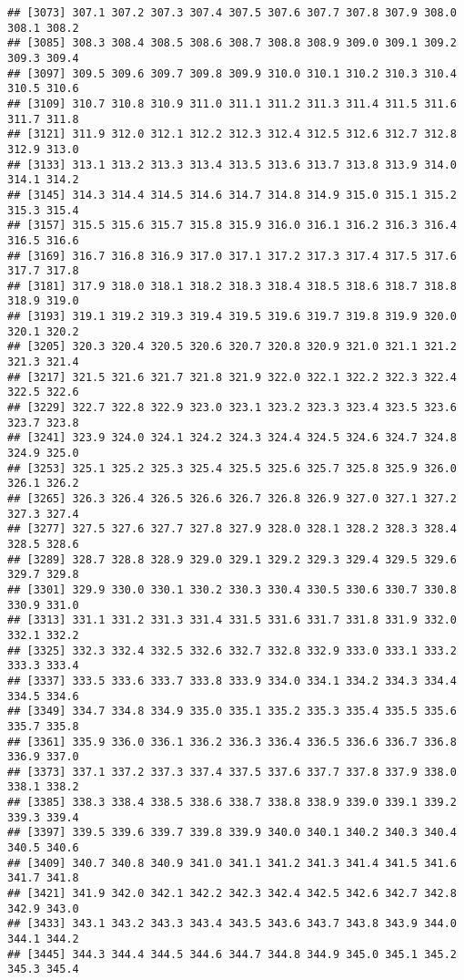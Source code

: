 \documentclass[
]{article}
\begin{document}
\begin{verbatim}
## [3073] 307.1 307.2 307.3 307.4 307.5 307.6 307.7 307.8 307.9 308.0 308.1 308.2
## [3085] 308.3 308.4 308.5 308.6 308.7 308.8 308.9 309.0 309.1 309.2 309.3 309.4
## [3097] 309.5 309.6 309.7 309.8 309.9 310.0 310.1 310.2 310.3 310.4 310.5 310.6
## [3109] 310.7 310.8 310.9 311.0 311.1 311.2 311.3 311.4 311.5 311.6 311.7 311.8
## [3121] 311.9 312.0 312.1 312.2 312.3 312.4 312.5 312.6 312.7 312.8 312.9 313.0
## [3133] 313.1 313.2 313.3 313.4 313.5 313.6 313.7 313.8 313.9 314.0 314.1 314.2
## [3145] 314.3 314.4 314.5 314.6 314.7 314.8 314.9 315.0 315.1 315.2 315.3 315.4
## [3157] 315.5 315.6 315.7 315.8 315.9 316.0 316.1 316.2 316.3 316.4 316.5 316.6
## [3169] 316.7 316.8 316.9 317.0 317.1 317.2 317.3 317.4 317.5 317.6 317.7 317.8
## [3181] 317.9 318.0 318.1 318.2 318.3 318.4 318.5 318.6 318.7 318.8 318.9 319.0
## [3193] 319.1 319.2 319.3 319.4 319.5 319.6 319.7 319.8 319.9 320.0 320.1 320.2
## [3205] 320.3 320.4 320.5 320.6 320.7 320.8 320.9 321.0 321.1 321.2 321.3 321.4
## [3217] 321.5 321.6 321.7 321.8 321.9 322.0 322.1 322.2 322.3 322.4 322.5 322.6
## [3229] 322.7 322.8 322.9 323.0 323.1 323.2 323.3 323.4 323.5 323.6 323.7 323.8
## [3241] 323.9 324.0 324.1 324.2 324.3 324.4 324.5 324.6 324.7 324.8 324.9 325.0
## [3253] 325.1 325.2 325.3 325.4 325.5 325.6 325.7 325.8 325.9 326.0 326.1 326.2
## [3265] 326.3 326.4 326.5 326.6 326.7 326.8 326.9 327.0 327.1 327.2 327.3 327.4
## [3277] 327.5 327.6 327.7 327.8 327.9 328.0 328.1 328.2 328.3 328.4 328.5 328.6
## [3289] 328.7 328.8 328.9 329.0 329.1 329.2 329.3 329.4 329.5 329.6 329.7 329.8
## [3301] 329.9 330.0 330.1 330.2 330.3 330.4 330.5 330.6 330.7 330.8 330.9 331.0
## [3313] 331.1 331.2 331.3 331.4 331.5 331.6 331.7 331.8 331.9 332.0 332.1 332.2
## [3325] 332.3 332.4 332.5 332.6 332.7 332.8 332.9 333.0 333.1 333.2 333.3 333.4
## [3337] 333.5 333.6 333.7 333.8 333.9 334.0 334.1 334.2 334.3 334.4 334.5 334.6
## [3349] 334.7 334.8 334.9 335.0 335.1 335.2 335.3 335.4 335.5 335.6 335.7 335.8
## [3361] 335.9 336.0 336.1 336.2 336.3 336.4 336.5 336.6 336.7 336.8 336.9 337.0
## [3373] 337.1 337.2 337.3 337.4 337.5 337.6 337.7 337.8 337.9 338.0 338.1 338.2
## [3385] 338.3 338.4 338.5 338.6 338.7 338.8 338.9 339.0 339.1 339.2 339.3 339.4
## [3397] 339.5 339.6 339.7 339.8 339.9 340.0 340.1 340.2 340.3 340.4 340.5 340.6
## [3409] 340.7 340.8 340.9 341.0 341.1 341.2 341.3 341.4 341.5 341.6 341.7 341.8
## [3421] 341.9 342.0 342.1 342.2 342.3 342.4 342.5 342.6 342.7 342.8 342.9 343.0
## [3433] 343.1 343.2 343.3 343.4 343.5 343.6 343.7 343.8 343.9 344.0 344.1 344.2
## [3445] 344.3 344.4 344.5 344.6 344.7 344.8 344.9 345.0 345.1 345.2 345.3 345.4

\end{verbatim}
\end{document}
